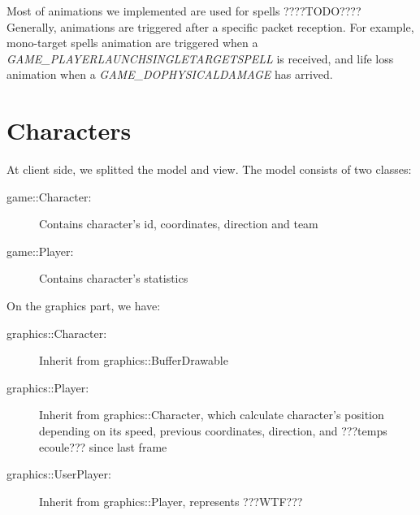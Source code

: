 \documentclass{scrreprt}
\begin{document}
			Most of animations we implemented are used for spells ????TODO????\\


				Generally, animations are triggered after a specific packet reception. For example, mono-target spells animation are triggered when a \emph{GAME\_PLAYERLAUNCHSINGLETARGETSPELL} is received, and life loss animation when a \emph{GAME\_DOPHYSICALDAMAGE} has arrived.

				\section{Characters}
				At client side, we splitted the model and view. The model consists of two classes:
				\begin{description}
				\item[game::Character:]{Contains character's id, coordinates, direction and team}
				\item[game::Player:]{Contains character's statistics}
				\end{description}

				On the graphics part, we have:
				\begin{description}
				\item[graphics::Character:]{Inherit from graphics::BufferDrawable}
				\item[graphics::Player:]{Inherit from graphics::Character, which calculate character's position depending on its speed, previous coordinates, direction, and ???temps ecoule??? since last frame}
				\item[graphics::UserPlayer:]{Inherit from graphics::Player, represents ???WTF???}
				\end{description}
\end{document}
